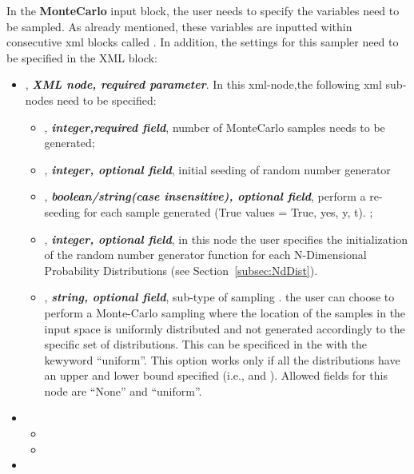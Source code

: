 In the \textbf{MonteCarlo} input block, the user needs to specify the variables need to be sampled. As already mentioned, these variables are inputted within consecutive xml blocks called . In addition, the settings for this sampler need to be specified in the  XML block:
\begin{itemize}
\item {},  \textit{\textbf{XML node, required parameter}}. In this xml-node,the following xml sub-nodes need to be specified:
  \begin{itemize}
    \item {}, \textit{\textbf{integer,required field}}, number of MonteCarlo samples needs to be generated;
    \item {}, \textit{\textbf{integer, optional field}}, initial seeding of random number generator
    \item {},  \textit{\textbf{boolean/string(case insensitive), optional field}}, perform a re-seeding for each sample generated (True values = True, yes, y, t). ;
    \item {},  \textit{\textbf{integer, optional field}}, in this node the user specifies the initialization of the random number generator function for each N-Dimensional Probability Distributions (see Section~\ref{subsec:NdDist}).
    \item {}, \textit{\textbf{string, optional field}}, sub-type of sampling . the user can choose to perform a Monte-Carlo sampling where the location of the samples in
the input space is uniformly distributed and not generated accordingly to the specific set of distributions. This can be specificed
in the  with the kewyword ``uniform''. This option works only if all the distributions have an upper and lower
bound specified (i.e.,  and ). Allowed fields for this node are ``None'' and ``uniform''.
  \end{itemize}
\end{itemize}
\begin{itemize}
\item \variableDescription
 \variableChildrenIntro
 \begin{itemize}
    \item \distributionDescription
    \item \functionDescription
 \end{itemize}
 \item \constantVariablesDescription
\end{itemize}


